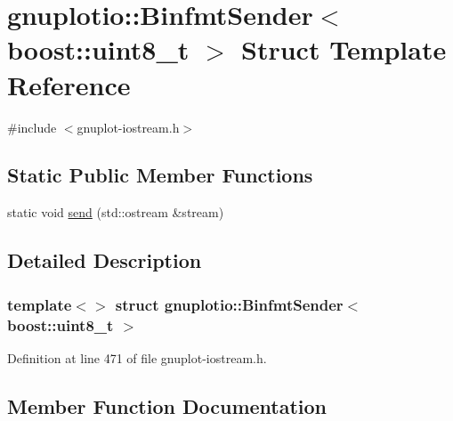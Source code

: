 \hypertarget{structgnuplotio_1_1_binfmt_sender_3_01boost_1_1uint8__t_01_4}{}\section{gnuplotio\+:\+:Binfmt\+Sender$<$ boost\+:\+:uint8\+\_\+t $>$ Struct Template Reference}
\label{structgnuplotio_1_1_binfmt_sender_3_01boost_1_1uint8__t_01_4}


{\ttfamily \#include $<$gnuplot-\/iostream.\+h$>$}

\subsection*{Static Public Member Functions}
\begin{DoxyCompactItemize}
\item 
static void \hyperlink{structgnuplotio_1_1_binfmt_sender_3_01boost_1_1uint8__t_01_4_a57d45c45f1ee19614c972bc82c4b214c}{send} (std\+::ostream \&stream)
\end{DoxyCompactItemize}


\subsection{Detailed Description}
\subsubsection*{template$<$$>$\newline
struct gnuplotio\+::\+Binfmt\+Sender$<$ boost\+::uint8\+\_\+t $>$}



Definition at line 471 of file gnuplot-\/iostream.\+h.



\subsection{Member Function Documentation}
\mbox{\label{structgnuplotio_1_1_binfmt_sender_3_01boost_1_1uint8__t_01_4_a57d45c45f1ee19614c972bc82c4b214c}} 
